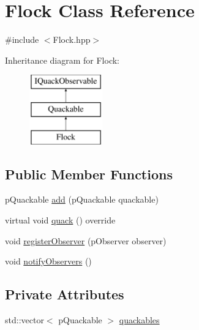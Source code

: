\hypertarget{classFlock}{\section{Flock Class Reference}
\label{classFlock}
}




  




{\ttfamily \#include $<$Flock.\-hpp$>$}

Inheritance diagram for Flock\-:\begin{figure}[H]
\begin{center}
\leavevmode
\includegraphics[height=3.000000cm]{classFlock}
\end{center}
\end{figure}
\subsection*{Public Member Functions}
\begin{DoxyCompactItemize}
\item 
p\-Quackable \hyperlink{classFlock_aacd4eaa3e4a0797cd21395cc5b1ff183}{add} (p\-Quackable quackable)
\item 
virtual void \hyperlink{classFlock_a3bbac4b6672dd5b30c5edeba5e70fe72}{quack} () override
\item 
void \hyperlink{classFlock_a715e88d384d12d8277807eee93ade6eb}{register\-Observer} (p\-Observer observer)
\item 
void \hyperlink{classFlock_a642f5892b550e2d46e109938156131e4}{notify\-Observers} ()
\end{DoxyCompactItemize}
\subsection*{Private Attributes}
\begin{DoxyCompactItemize}
\item 
std\-::vector$<$ p\-Quackable $>$ \hyperlink{classFlock_a53e167d71e14dfd64e02c35cc6c94433}{quackables}
\end{DoxyCompactItemize}


